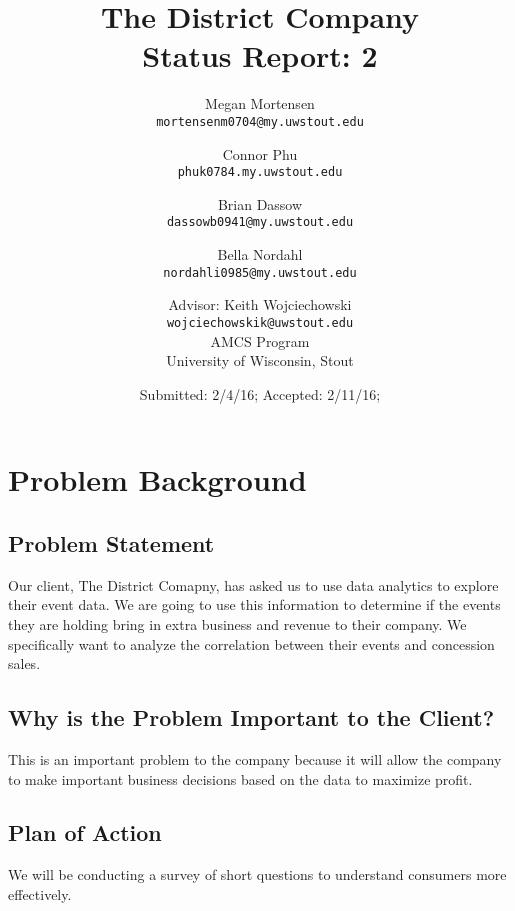 \documentclass[11pt]{report}
\title{The District Company \\ Status Report: 2}
\author{
Megan Mortensen\\
\small \texttt{mortensenm0704@my.uwstout.edu}
\and
Connor Phu\\
\small \texttt{phuk0784.my.uwstout.edu}
\and
Brian Dassow\\
\small \texttt{dassowb0941@my.uwstout.edu}
\and
Bella Nordahl\\
\small \texttt{nordahli0985@my.uwstout.edu}
\and
Advisor: Keith Wojciechowski\\
\small \texttt{wojciechowskik@uwstout.edu}\\
\bigskip
AMCS Program\\
University of Wisconsin, Stout
}
\date{\small Submitted: 2/4/16;  Accepted: 2/11/16;}
\begin{document}
\maketitle

\section*{\hspace{-.5cm} Problem Background}

\subsection*{\hspace{-.5cm} Problem Statement}\label{intro}
Our client, The District Comapny, has asked us to use data analytics to explore their event data. We are going to use this information to determine if the events they are holding bring in extra business and revenue to their company. We specifically want to analyze the correlation between their events and concession sales.

\subsection*{\hspace{-.5cm} Why is the Problem Important to the Client?}\label{tech} 
This is an important problem to the company because it will allow the company to make important business decisions based on the data to maximize profit.

\subsection*{\hspace{-.5cm}Plan of Action}\label{tech}
We will be conducting a survey of short questions to understand consumers more effectively. 
\end{document}
